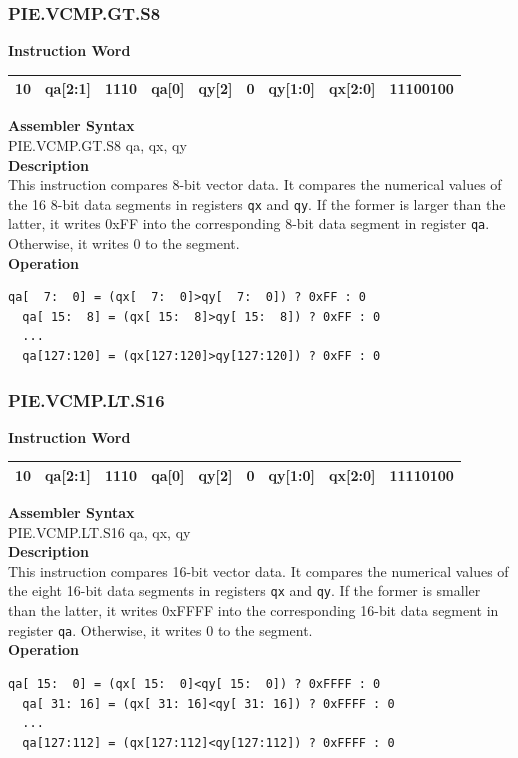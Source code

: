 \newpage
\subsubsection{PIE.VCMP.GT.S8}\label{instruction:PIEVCMPGTS8}
\setlength\tabcolsep{6pt}
\textbf{Instruction Word} \\
\begin{tabular}{|c|c|c|c|c|c|c|c|c|}
	\hline
	10 & qa[2:1] & 1110 & qa[0] & qy[2] & 0 & qy[1:0] & qx[2:0] & 11100100 \\
	\hline
\end{tabular}

\textbf{Assembler Syntax} \\
PIE.VCMP.GT.S8 qa, qx, qy \\
\textbf{Description} \\
This instruction compares 8-bit vector data. It compares the numerical values of the 16 8-bit data segments in registers \lstinline{qx} and \lstinline{qy}. If the former is larger than the latter, it writes 0xFF into the corresponding 8-bit data segment in register \lstinline{qa}. Otherwise, it writes 0 to the segment.\\
\textbf{Operation}
\begin{lstlisting}[escapeinside=`?]
  qa[  7:  0] = (qx[  7:  0]>qy[  7:  0]) ? 0xFF : 0
  qa[ 15:  8] = (qx[ 15:  8]>qy[ 15:  8]) ? 0xFF : 0
  ...
  qa[127:120] = (qx[127:120]>qy[127:120]) ? 0xFF : 0
\end{lstlisting}

\newpage
\subsubsection{PIE.VCMP.LT.S16}\label{instruction:PIEVCMPLTS16}
\setlength\tabcolsep{6pt}
\textbf{Instruction Word} \\
\begin{tabular}{|c|c|c|c|c|c|c|c|c|}
	\hline
	10 & qa[2:1] & 1110 & qa[0] & qy[2] & 0 & qy[1:0] & qx[2:0] & 11110100 \\
	\hline
\end{tabular}

\textbf{Assembler Syntax} \\
PIE.VCMP.LT.S16 qa, qx, qy \\
\textbf{Description} \\
This instruction compares 16-bit vector data. It compares the numerical values of the eight 16-bit data segments in registers \lstinline{qx} and \lstinline{qy}. If the former is smaller than the latter, it writes 0xFFFF into the corresponding 16-bit data segment in register \lstinline{qa}. Otherwise, it writes 0 to the segment.\\
\textbf{Operation}
\begin{lstlisting}[escapeinside=`?]
  qa[ 15:  0] = (qx[ 15:  0]<qy[ 15:  0]) ? 0xFFFF : 0
  qa[ 31: 16] = (qx[ 31: 16]<qy[ 31: 16]) ? 0xFFFF : 0
  ...
  qa[127:112] = (qx[127:112]<qy[127:112]) ? 0xFFFF : 0
\end{lstlisting}

